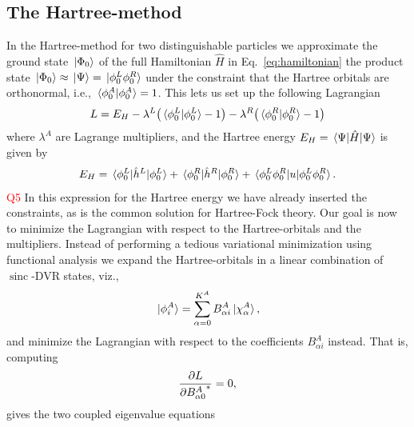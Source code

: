\documentclass[twocolumn,superscriptaddress,unsortedaddress,
 amsmath,amssymb,
 aps,
]{revtex4-2}
\DeclareMathOperator{\sinc}{sinc}
\begin{document}
    \subsection{The Hartree-method}
        In the Hartree-method for two distinguishable particles
        we approximate the ground state $\ket*{\Phi_0}$ of the
        full Hamiltonian $\hat{H}$ in Eq.~\eqref{eq:hamiltonian}
        the product state $\ket*{\Phi_0} \approx \ket*{\Psi}
        = \ket*{\phi^L_0 \phi^R_0}$ under the constraint that
        the Hartree orbitals are orthonormal, i.e., $\braket*{
        \phi^A_0}{\phi^A_0} = 1$.
        This lets us set up the following Lagrangian 
        \begin{align*}
            L
            = E_{H}
            - \lambda^L \qty(\braket*{\phi^L_0}{\phi^L_0} - 1)
            - \lambda^R \qty(\braket*{\phi^R_0}{\phi^R_0} - 1)
        \end{align*}
        where $\lambda^A$ are Lagrange multipliers, and the
        Hartree energy $E_H = \mel*{\Psi}{\hat{H}}{\Psi}$ is
        given by
        \begin{align*}
            E_H
            =
            \mel*{\phi^L_0}{\hat{h}^L}{\phi^L_0}
            + \mel*{\phi^R_0}{\hat{h}^R}{\phi^R_0}
            + \mel*{
                \phi^L_0 \phi^R_0
            }{u}{
                \phi^L_0 \phi^R_0
            }.
        \end{align*}
        \textcolor{red}{Q5} In this expression for the Hartree energy we have already inserted the constraints, as is the common solution for Hartree-Fock theory.
        Our goal is now to minimize the Lagrangian with respect
        to the Hartree-orbitals and the multipliers.
        Instead of performing a tedious variational
        minimization using functional analysis we expand the
        Hartree-orbitals in a linear combination of
        $\sinc$-DVR states, viz.,
        \begin{align}
            \ket*{\phi^A_i}
            = \sum_{\alpha = 0}^{K^A}
            B^A_{\alpha i} \ket*{\chi^A_{\alpha}},
            \label{eq:hartree-expansion}
        \end{align}
        and minimize the Lagrangian with respect to the coefficients
        $B^A_{\alpha i}$ instead.
        That is, computing
        \begin{align*}
            \pdv{L}{{B^A_{\alpha 0}}^{*}} = 0,
        \end{align*}
        gives the two coupled eigenvalue equations
\end{document}
